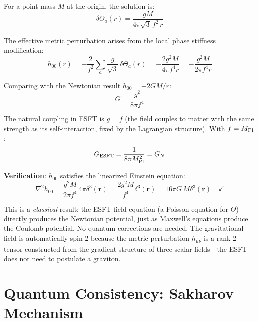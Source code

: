 ﻿\documentclass[twocolumn,preprintnumbers,amsmath,amssymb,prd]{revtex4-2}
\begin{document}
For a point mass $M$ at the origin, the solution is:
\begin{equation}
\delta\Theta_a(r) = \frac{gM}{4\pi\sqrt{3}\,f^2\,r}
\label{eq:field_sol}
\end{equation}

The effective metric perturbation arises from the local phase stiffness modification:
\begin{equation}
h_{00}(r) = -\frac{2}{f^2}\sum_a \frac{g}{\sqrt{3}}\,\delta\Theta_a(r) = -\frac{2g^2 M}{4\pi f^4 r} = -\frac{g^2 M}{2\pi f^4 r}
\label{eq:h00}
\end{equation}

Comparing with the Newtonian result $h_{00} = -2GM/r$:
\begin{equation}
\boxed{G = \frac{g^2}{8\pi f^4}}
\label{eq:G_classical}
\end{equation}

The natural coupling in ESFT is $g = f$ (the field couples to matter with the same strength as its self-interaction, fixed by the Lagrangian structure). With $f = M_{\rm Pl}$:
\begin{equation}
G_{\rm ESFT} = \frac{1}{8\pi M_{\rm Pl}^2} = G_N
\label{eq:G_result}
\end{equation}

\textbf{Verification}: $h_{00}$ satisfies the linearized Einstein equation:
\begin{equation}
\nabla^2 h_{00} = \frac{g^2 M}{2\pi f^4}\,4\pi\delta^3(\mathbf{r}) = \frac{2g^2 M}{f^4}\delta^3(\mathbf{r}) = 16\pi G\,M\delta^3(\mathbf{r}) \quad \checkmark
\end{equation}

This is a \emph{classical} result: the ESFT field equation (a Poisson equation for $\Theta$) directly produces the Newtonian potential, just as Maxwell's equations produce the Coulomb potential. No quantum corrections are needed. The gravitational field is automatically spin-2 because the metric perturbation $h_{\mu\nu}$ is a rank-2 tensor constructed from the gradient structure of three scalar fields---the ESFT does not need to postulate a graviton.

\section{Quantum Consistency: Sakharov Mechanism}
\label{sec:sakharov}
\end{document}
